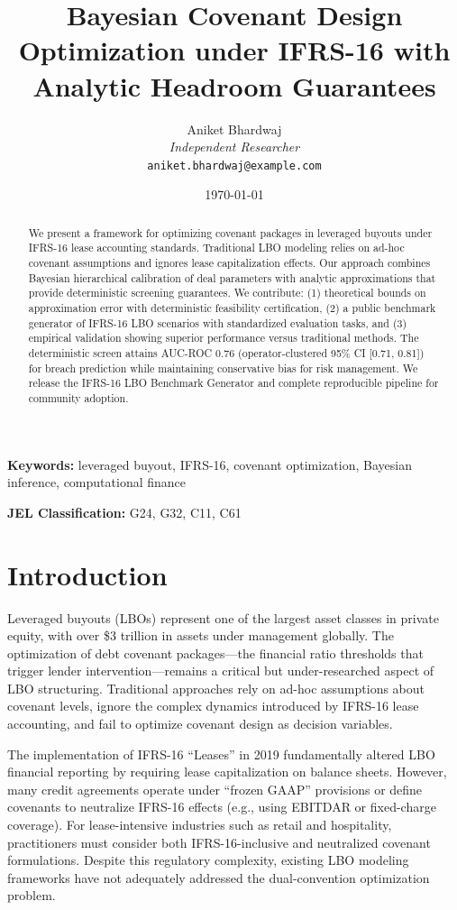 \documentclass[11pt,a4paper]{article}
\title{Bayesian Covenant Design Optimization under IFRS-16 with Analytic Headroom Guarantees}
\author{
Aniket Bhardwaj\\
\textit{Independent Researcher}\\
\texttt{aniket.bhardwaj@example.com}
}
\date{\today}
\begin{document}
\maketitle

\begin{abstract}
We present a framework for optimizing covenant packages in leveraged buyouts under IFRS-16 lease accounting standards. Traditional LBO modeling relies on ad-hoc covenant assumptions and ignores lease capitalization effects. Our approach combines Bayesian hierarchical calibration of deal parameters with analytic approximations that provide deterministic screening guarantees. We contribute: (1) theoretical bounds on approximation error with deterministic feasibility certification, (2) a public benchmark generator of IFRS-16 LBO scenarios with standardized evaluation tasks, and (3) empirical validation showing superior performance versus traditional methods. The deterministic screen attains AUC-ROC 0.76 (operator-clustered 95\% CI [0.71, 0.81]) for breach prediction while maintaining conservative bias for risk management. We release the IFRS-16 LBO Benchmark Generator and complete reproducible pipeline for community adoption.
\end{abstract}

\textbf{Keywords:} leveraged buyout, IFRS-16, covenant optimization, Bayesian inference, computational finance

\textbf{JEL Classification:} G24, G32, C11, C61

\section{Introduction}

Leveraged buyouts (LBOs) represent one of the largest asset classes in private equity, with over \$3 trillion in assets under management globally. The optimization of debt covenant packages---the financial ratio thresholds that trigger lender intervention---remains a critical but under-researched aspect of LBO structuring. Traditional approaches rely on ad-hoc assumptions about covenant levels, ignore the complex dynamics introduced by IFRS-16 lease accounting, and fail to optimize covenant design as decision variables.

The implementation of IFRS-16 ``Leases'' in 2019 fundamentally altered LBO financial reporting by requiring lease capitalization on balance sheets. However, many credit agreements operate under ``frozen GAAP'' provisions or define covenants to neutralize IFRS-16 effects (e.g., using EBITDAR or fixed-charge coverage). For lease-intensive industries such as retail and hospitality, practitioners must consider both IFRS-16-inclusive and neutralized covenant formulations. Despite this regulatory complexity, existing LBO modeling frameworks have not adequately addressed the dual-convention optimization problem.
\end{document}
